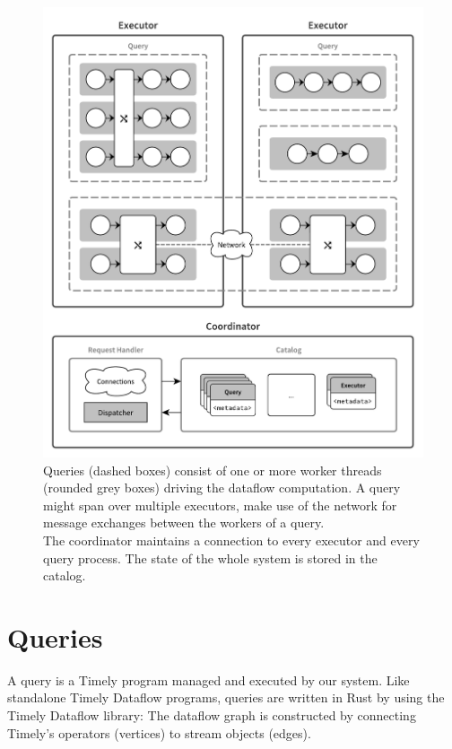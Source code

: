 \begin{figure}[htb]
  \centering
    \includegraphics[width=1\textwidth]{figures/components}
  \caption[System architecture.]{ Queries (dashed boxes) consist of one or
  more worker threads (rounded grey boxes) driving the dataflow computation.
  A query might span over multiple executors, make use of the network for message exchanges
  between the workers of a query.\\
  The coordinator maintains a connection to every  executor and every query process.
  The state of the whole system is stored in the catalog.}
  \label{fig:components}
\end{figure}

\clearpage

\section{Queries}

A query is a Timely program managed and executed by our system. Like
standalone Timely Dataflow programs, queries are written in Rust by using the
Timely Dataflow library: The dataflow graph is constructed by connecting
Timely's operators (vertices) to stream objects (edges).

